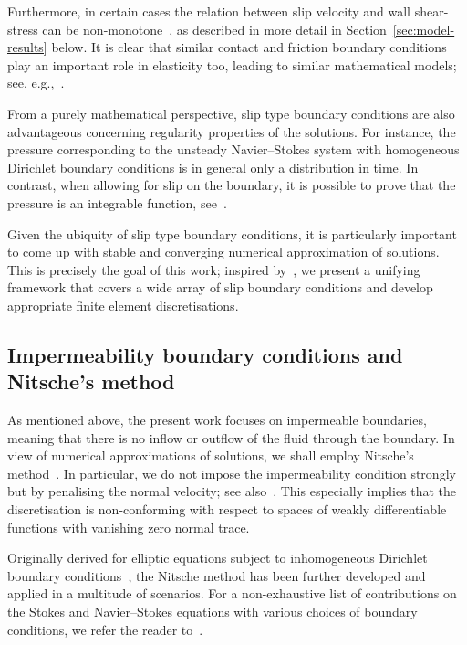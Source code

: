 \documentclass[reqno,a4paper]{amsart}
\begin{document}
	Furthermore, in certain cases the relation between slip velocity and wall shear-stress can be non-monotone~\cite{YarinGraham1998,Hervet2003}, as described in more detail in Section~\ref{sec:model-results} below. It is clear that similar contact and friction boundary conditions play an important role in elasticity too, leading to similar mathematical models; see, e.g.,~\cite{Kikuchi1988}. 
	
	From a purely mathematical perspective, slip type boundary conditions are also advantageous concerning regularity properties of the solutions.
	For instance, the pressure corresponding {to} the unsteady Navier--Stokes system with homogeneous Dirichlet boundary conditions is in general only a distribution in time.
	In contrast, when allowing for slip on the boundary, it is possible to prove that the pressure is an integrable function, see~\cite{BM.2017}. 
	
	Given the ubiquity of slip type boundary conditions, it is particularly important to come up with stable and converging numerical approximation of solutions.
	{This is precisely the goal of this work; inspired by~\cite{Abbatiello2021}, we present a unifying framework that covers a wide array of slip boundary conditions and develop appropriate finite element discretisations.} 
	
	\subsection{Impermeability boundary  {conditions} {and Nitsche's method}}	
	As mentioned above, the present work focuses on impermeable boundaries, meaning that there is no inflow or outflow of the fluid through the boundary. 
	In view of numerical approximations of solutions, we shall employ Nitsche's method~\cite{Nitsche1971}. 
 In particular, we do  not impose the impermeability condition strongly but by penalising the normal velocity; see also~\cite{S.1995}. 
	This especially implies that the discretisation is non-conforming with respect to spaces of weakly differentiable functions with vanishing zero normal trace. 
	
	Originally derived for elliptic equations subject to inhomogeneous Dirichlet boundary conditions~\cite{Nitsche1971}, the Nitsche method  has been further developed and applied in a multitude of scenarios. 
	For a non-exhaustive list of contributions on the Stokes and Navier--Stokes equations with various choices of boundary conditions, we refer the reader to~\cite{FS.1995,S.1995,BeckerCapatinaLuceEtAl2015,GS.2022}. 
	
\end{document}
